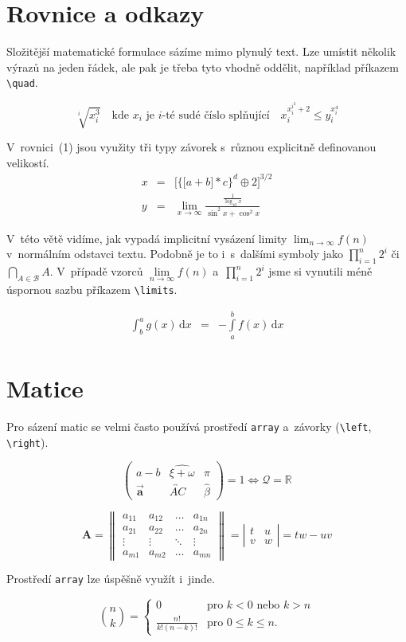 \documentclass[a4paper, 11pt, twocolumn]{article}
\begin{document}
\section{Rovnice a odkazy}
Složitější matematické formulace sázíme mimo plynulý
text. Lze umístit několik výrazů na jeden řádek, ale pak je třeba tyto vhodně oddělit, například příkazem \verb|\quad|.

\[\sqrt[i]{x^3_i}\quad\text{kde } x_i \text{ je } i\text{-té sudé číslo splňující}\quad x_i^{x_i^{i^2}+2}\leq y_i^{x_i^4}\]

V~rovnici~(1) jsou využity tři typy závorek s~různou
explicitně definovanou velikostí.
\begin{eqnarray}
    x &=& \bigg[\Big\{\big[a+b\big]*c\Big\}^d\oplus2\bigg]^{3/2}\label{eq:1} \\
    y &=& \lim_{x\to\infty} \frac{\frac{1}{\log_{10}x}}{\sin^2x + \cos^2x} \nonumber
\end{eqnarray}

V~této větě vidíme, jak vypadá implicitní vysázení limity $\lim_{n\to\infty} f(n)$ v~normálním odstavci textu. Podobně je to i~s~dalšími symboly jako $\prod_{i=1}^n 2^i$ či $\bigcap_{A \in \mathcal{B}}A$. V~případě vzorců $\lim\limits_{n\to\infty} f(n)$ a~$\prod\limits_{i=1}^n 2^i$ jsme si vynutili méně úspornou sazbu příkazem \verb|\limits|.

\begin{eqnarray}
    \int_b^a g(x)\,\mathrm{d}x &=& -\int\limits_a^b f(x)\,\mathrm{d}x
\end{eqnarray}

\section{Matice}
Pro sázení matic se velmi často používá prostředí \texttt{array} a~závorky (\verb|\left|, \verb|\right|).

\[\left( \begin{array}{ccc}
a-b & \widehat{\xi+\omega} & \pi \\
\vec{\mathbf{a}} & \overleftrightarrow{AC} & \hat{\beta}
\end{array} \right) = 1 \Longleftrightarrow \mathcal{Q} = \mathbb{R}\]

\[ \mathbf{A} = \left\|\begin{array}{cccc}
a_{11} & a_{12} & \dots & a_{1n} \\
a_{21} & a_{22} & \dots & a_{2n} \\
\vdots & \vdots & \ddots & \vdots \\
a_{m1} & a_{m2} & \hdots & a_{mn}
\end{array}\right\| = 
\left|\begin{array}{rl}
t & u \\
v & w
\end{array}\right| = tw - uv\]

Prostředí \texttt{array} lze úspěšně využít i~jinde.

\[\binom{n}{k} = \left\{\begin{array}{cl}
0   & \text{pro } k < 0 \text{ nebo } k > n \\
\frac{n!}{k!(n-k)!} & \text{pro } 0 \leq k \leq n.
\end{array}\right.\]
\end{document}
